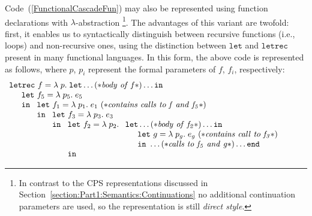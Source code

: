 Code~(\ref{FunctionalCascadeFun}) may also be represented using
function declarations with $\lambda$-abstraction \footnote{In contrast
  to the CPS representations discussed in
  Section~\ref{section:Part1:Semantics:Continuations} no additional
  continuation parameters are used, so the representation is still
  \emph{direct style}.}. The advantages of this variant are twofold:
first, it enables us to syntactically distinguish between recursive
functions (i.e., loops) and non-recursive ones, using the distinction
between $\mathtt{let}$ and $\mathtt{letrec}$ present in many
functional languages. In this form, the above code is represented as
follows, where $p$, $p_i$ represent the formal parameters of $f$,
$f_i$, respectively:
\begin{equation}
\label{FuntionalCascadeFun}
\begin{array}{l}
  \mathtt{letrec}\ f = \lambda\; p.\;
  \mathtt{let} \ldots (* \mathit{body\ of\ f}*)\ldots \mathtt{in}\\
  \quad \begin{array}{l}
          \mathtt{let}\ f_5 = \lambda\; p_5.\; e_5\\ \mathtt{in}\  
          \begin{array}[t]{l}
            \mathtt{let}\ f_1 = \lambda\;  p_1.\; e_1\ 
                 (* \mathit{contains\ calls\ to\ f\ and\ f_5}*) \\ \mathtt{in}\ 
            \begin{array}[t]{l}
              \mathtt{let}\ f_3 = \lambda\; p_3.\; e_3\\ \mathtt{in}\ 
              \begin{array}[t]{l}
                \mathtt{let}\ f_2 = \lambda\; p_2.\;
                 \begin{array}[t]{l}
                    \mathtt{let} \ldots (* \mathit{body\ of\ f_2}*)\ldots
                      \mathtt{in}\\
                     \quad \begin{array}{l}
                        \mathtt{let}\ g = \lambda\; p_g.\; e_g\
                           (* \mathit{contains\ call\ to\ f_3}*)\\ 
                        \mathtt{in}\   \ldots 
                              (* \mathit{calls\ to\ f_5\ and\ g} *)
                        \ldots \mathtt{end}
                     \end{array}\\
                   \end{array}\\ \mathtt{in}\

\end{array}
\end{array}
\end{array}
\end{array}
\end{array}
\end{equation}
